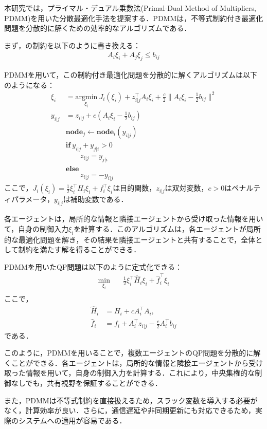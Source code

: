 本研究では，プライマル・デュアル乗数法(Primal-Dual Method of Multipliers, PDMM)を用いた分散最適化手法を提案する．PDMMは，不等式制約付き最適化問題を分散的に解くための効率的なアルゴリズムである．

まず，の制約を以下のように書き換える：
\begin{equation}
\begin{aligned}
A_i \xi_i + A_j \xi_j \leq b_{ij}
\label{eq:common_cbf_constraint_rewritten}
\end{aligned}
\end{equation}

PDMMを用いて，この制約付き最適化問題を分散的に解くアルゴリズムは以下のようになる：
\begin{equation}
\begin{aligned}
\xi_i &= \underset{\xi_i}{\text{argmin}} \:J_i(\xi_i) + z_{i|j}^\top A_i\xi_i + \frac{c}{2}\|A_i\xi_i - \frac{1}{2}b_{ij}\|^2 \\
y_{i|j} &= z_{i|j} + c(A_i\xi_i - \frac{1}{2}b_{ij}) \\
&\mathbf{node}_j \leftarrow \mathbf{node}_i(y_{i|j}) \\
&\mathbf{if}\:y_{i|j} + y_{j|i} > 0 \\
&\qquad z_{i|j} = y_{j|i} \\
&\mathbf{else} \\
&\qquad z_{i|j} = -y_{i|j}
\label{eq:pdmm_algorithm}
\end{aligned}
\end{equation}
ここで，$J_i(\xi_i) = \frac{1}{2}\xi_i^\top H_i \xi_i + f_i^\top \xi_i$は目的関数，$z_{i|j}$は双対変数，$c > 0$はペナルティパラメータ，$y_{i|j}$は補助変数である．

各エージェントは，局所的な情報と隣接エージェントから受け取った情報を用いて，自身の制御入力$\xi_i$を計算する．このアルゴリズムは，各エージェントが局所的な最適化問題を解き，その結果を隣接エージェントと共有することで，全体として制約を満たす解を得ることができる．

PDMMを用いたQP問題は以下のように定式化できる：
\begin{equation}
\begin{aligned}
\min_{\xi_i} \quad & \frac{1}{2}\xi_i^\top \hat{H}_i \xi_i + \hat{f}_i^\top \xi_i \\
\label{eq:pdmm_qp}
\end{aligned}
\end{equation}
ここで，
\begin{equation}
\begin{aligned}
\hat{H}_i &= H_i + c A_i^\top A_i, \\
\hat{f}_i &= f_i + A_i^\top z_{i|j} - \frac{c}{2}A_i^\top b_{ij}
\label{eq:pdmm_qp_params}
\end{aligned}
\end{equation}
である．

このように，PDMMを用いることで，複数エージェントのQP問題を分散的に解くことができる．各エージェントは，局所的な情報と隣接エージェントから受け取った情報を用いて，自身の制御入力を計算する．これにより，中央集権的な制御なしでも，共有視野を保証することができる．

また，PDMMは不等式制約を直接扱えるため，スラック変数を導入する必要がなく，計算効率が良い．さらに，通信遅延や非同期更新にも対応できるため，実際のシステムへの適用が容易である．
